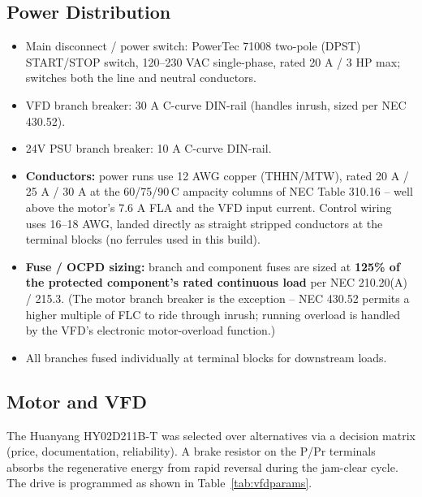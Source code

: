 \documentclass[hidelinks,12pt]{article}
\begin{document}
\subsection{Power Distribution}
\begin{itemize}
    \item Main disconnect / power switch: PowerTec 71008 two-pole (DPST) START/STOP switch, 120--230 VAC single-phase, rated 20 A / 3 HP max; switches both the line and neutral conductors.
    \item VFD branch breaker: 30 A C-curve DIN-rail (handles inrush, sized per NEC 430.52).
    \item 24V PSU branch breaker: 10 A C-curve DIN-rail.
    \item \textbf{Conductors:} power runs use 12 AWG copper (THHN/MTW), rated 20 A / 25 A / 30 A at the 60/75/90\,\textdegree C ampacity columns of NEC Table 310.16 -- well above the motor's 7.6 A FLA and the VFD input current. Control wiring uses 16--18 AWG, landed directly as straight stripped conductors at the terminal blocks (no ferrules used in this build).
    \item \textbf{Fuse / OCPD sizing:} branch and component fuses are sized at \textbf{125\% of the protected component's rated continuous load} per NEC 210.20(A) / 215.3. (The motor branch breaker is the exception -- NEC 430.52 permits a higher multiple of FLC to ride through inrush; running overload is handled by the VFD's electronic motor-overload function.)
    \item All branches fused individually at terminal blocks for downstream loads.
\end{itemize}

\subsection{Motor and VFD}
\label{sec:motorvfd}
The Huanyang HY02D211B-T was selected over alternatives via a decision matrix (price,
documentation, reliability). A brake resistor on the P/Pr terminals absorbs the
regenerative energy from rapid reversal during the jam-clear cycle. The drive is
programmed as shown in Table~\ref{tab:vfdparams}.
\end{document}
